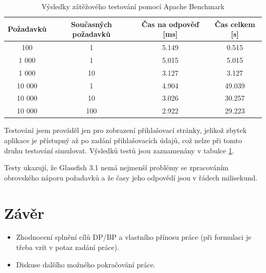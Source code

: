 \documentclass[11pt,twoside,a4paper]{book}
\begin{document}
\begin{table}[!t]
	\begin{center}
		\begin{tabular}[b]{|c|c|c|c|}
		\hline
		Požadavků & Současných požadavků & Čas na odpověď [ms] & Čas celkem [s] \\
		\hline		
		100 & 1 &  5.149 &  0.515 \\
		\hline
		1 000 & 1 & 5.015 & 5.015 \\
		\hline
		1 000 & 10 & 3.127 & 3.127 \\
		\hline
		10 000 & 1 & 4.904 & 49.039 \\
		\hline
		10 000 & 10 & 3.026 & 30.257 \\
		\hline
		10 000 & 100 & 2.922 & 29.223 \\
		\hline
		\end{tabular}
	\end{center}
	\caption{Výsledky zátěžového testování pomocí Apache Benchmark}
	\label{tab:zatezove_testovani}
\end{table}

Testování jsem prováděl jen pro zobrazení přihlašovací stránky, jelikož zbytek aplikace je přístupný až po zadání přihlašovacích údajů, což nelze při tomto druhu testování simulovat. Výsledků testů jsou zaznamenány v tabulce \ref{tab:zatezove_testovani}. 

\newpage

Testy ukazují, že Glassfish 3.1 nemá nejmenší problémy se zpracováním obrovského náporu požadavků a že časy jeho odpovědí jsou v řádech milisekund.

\chapter{Závěr}

\begin{itemize}
\item Zhodnocení splnění cílů DP/BP a  vlastního přínosu práce (při formulaci je třeba vzít v potaz zadání práce).
\item Diskuse dalšího možného pokračování práce.
\end{itemize} 

\end{document}
